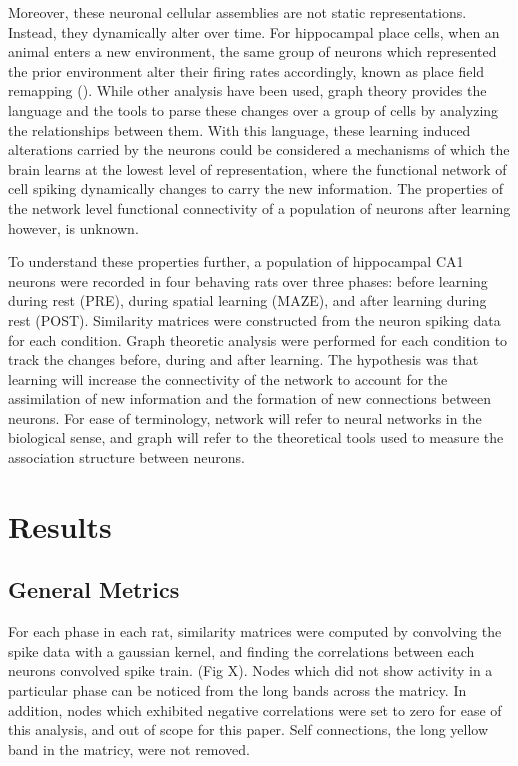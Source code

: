 \documentclass[9pt,twocolumn,twoside,lineno]{pnas-new}
\begin{document}
Moreover, these neuronal cellular assemblies are not static representations. Instead, they dynamically alter over time. For hippocampal place cells, when an animal enters a new environment, the same group of neurons which represented the prior environment alter their firing rates accordingly, known as place field remapping (). While other analysis have been used, graph theory provides the language and the tools to parse these changes over a group of cells by analyzing the relationships between them. With this language, these learning induced alterations carried by the neurons could be considered a mechanisms of which the brain learns at the lowest level of representation, where the functional network of cell spiking dynamically changes to carry the new information. The properties of the network level functional connectivity of a population of neurons after learning however, is unknown.

To understand these properties further, a population of hippocampal CA1 neurons were recorded in four behaving rats over three phases: before learning during rest (PRE), during spatial learning (MAZE), and after learning during rest (POST). Similarity matrices were constructed from the neuron spiking data for each condition. Graph theoretic analysis were performed for each condition to track the changes before, during and after learning. The hypothesis was that learning will increase the connectivity of the network to account for the assimilation of new information and the formation of new connections between neurons. For ease of terminology, network will refer to neural networks in the biological sense, and graph will refer to the theoretical tools used to measure the association structure between neurons.



\section*{Results}
\subsection*{General Metrics}
For each phase in each rat, similarity matrices were computed by convolving the spike data with a gaussian kernel, and finding the correlations between each neurons convolved spike train. (Fig X). Nodes which did not show activity in a particular phase can be noticed from the long bands across the matricy. In addition, nodes which exhibited negative correlations were set to zero for ease of this analysis, and out of scope for this paper. Self connections, the long yellow band in the matricy, were not removed.
\end{document}
